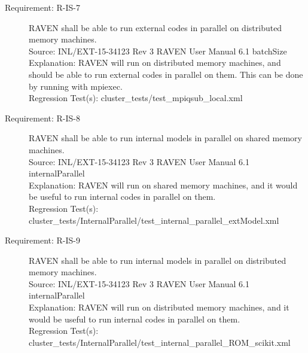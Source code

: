 \documentclass{article}
\newcommand{\requirement}[5]{\item[Requirement: #1] #2 \\Source: #3\\Explanation: #4\\Regression Test(s): #5}
\begin{document}
\begin{description}
\requirement{R-IS-7}{RAVEN shall be able to run external codes in parallel on distributed memory machines.}
{INL/EXT-15-34123 Rev 3 RAVEN User Manual 6.1 batchSize}
{RAVEN will run on distributed memory machines, and should be able to run external codes in parallel on them.  This can be done by running with mpiexec.}
{cluster\_tests/test\_mpiqsub\_local.xml}

\requirement{R-IS-8}{RAVEN shall be able to run internal models in parallel on shared memory machines.}
{INL/EXT-15-34123 Rev 3 RAVEN User Manual 6.1 internalParallel}
{RAVEN will run on shared memory machines, and it would be useful to run internal codes in parallel on them.}
{cluster\_tests/InternalParallel/test\_internal\_parallel\_extModel.xml}

\requirement{R-IS-9}{RAVEN shall be able to run internal models in parallel on distributed memory machines.}
{INL/EXT-15-34123 Rev 3 RAVEN User Manual 6.1 internalParallel}
{RAVEN will run on distributed memory machines, and it would be useful to run internal codes in parallel on them.}
{cluster\_tests/InternalParallel/test\_internal\_parallel\_ROM\_scikit.xml}

\end{description}
\end{document}
